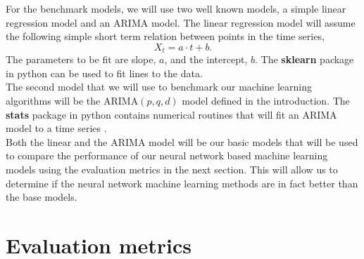 \documentclass[10pt,a4paper]{article}
\begin{document}

For the benchmark models, we will use two well known models, a simple linear regression model and an ARIMA model. The linear regression model will assume the following simple short term relation between points in the time series,
\begin{equation}
X_{t} = a\cdot t + b.
\end{equation}
The parameters to be fit are slope, $a$, and the intercept, $b$. The {\bf sklearn} package in python can be used to fit lines to the data.\\

The second model that we will use to benchmark our machine learning algorithms will be the ARIMA$(p,q,d)$ model defined in the introduction. The {\bf stats} package in python contains numerical routines that will fit an ARIMA model to a time series \cite{Vincent_2018}.\\

Both the linear and the ARIMA model will be our basic models that will be used to compare the performance of our neural network based machine learning models using the evaluation metrics in the next section. This will allow us to determine if the neural network machine learning methods are in fact better than the base models.


\section{Evaluation metrics}

\end{document}
